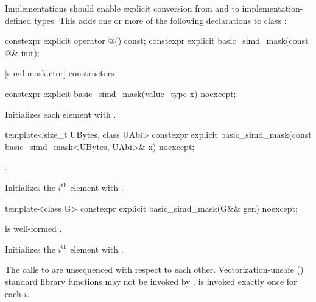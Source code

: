 \pnum
Implementations should enable explicit conversion from and to implementation-defined types. This
adds one or more of the following declarations to class :

\begin{codeblock}
constexpr explicit operator @\impdef@() const;
constexpr explicit basic_simd_mask(const @\impdef@& init);
\end{codeblock}

[simd.mask.ctor]{ constructors}

\begin{itemdecl}
constexpr explicit basic_simd_mask(value_type x) noexcept;
\end{itemdecl}

\begin{itemdescr}
  \pnum\effects
  Initializes each element with .
\end{itemdescr}

\begin{itemdecl}
template<size_t UBytes, class UAbi>
  constexpr explicit basic_simd_mask(const basic_simd_mask<UBytes, UAbi>& x) noexcept;
\end{itemdecl}

\begin{itemdescr}
  \pnum\constraints
  .

  \pnum\effects
  Initializes the $i^\text{th}$ element with  \foralli.
\end{itemdescr}

\begin{itemdecl}
template<class G> constexpr explicit basic_simd_mask(G&& gen) noexcept;
\end{itemdecl}

\begin{itemdescr}
  \pnum\constraints
   is
  well-formed \foralli.

  \pnum\effects
  Initializes the $i^\text{th}$ element with
   \foralli.

  \pnum
    The calls to  are unsequenced with respect to each other.
    Vectorization-unsafe () standard library
    functions may not be invoked by .
     is invoked exactly once for each $i$.
\end{itemdescr}


